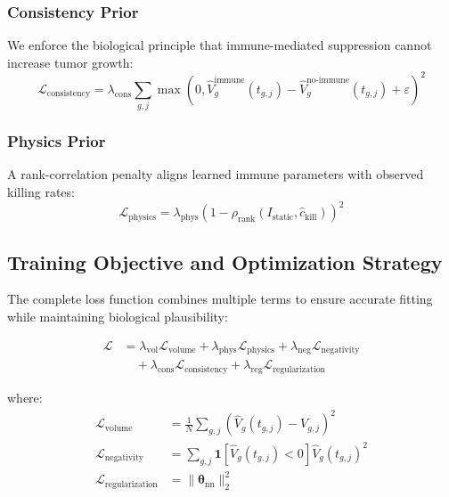 \documentclass{juliacon}
\begin{document}
\subsubsection{Consistency Prior}
We enforce the biological principle that immune-mediated suppression cannot increase tumor growth:
\begin{equation}
\mathcal{L}_{\text{consistency}} = \lambda_{\text{cons}} \sum_{g,j} \max\left(0, \hat{V}^{\text{immune}}_g(t_{g,j}) - \hat{V}^{\text{no-immune}}_g(t_{g,j}) + \varepsilon\right)^2
\label{eq:consistency_prior}
\end{equation}

\subsubsection{Physics Prior}
A rank-correlation penalty aligns learned immune parameters with observed killing rates:
\begin{equation}
\mathcal{L}_{\text{physics}} = \lambda_{\text{phys}}\left(1 - \rho_{\text{rank}}(I_{\text{static}}, \hat{c}_{\text{kill}})\right)^2
\label{eq:physics_prior}
\end{equation}

\subsection{Training Objective and Optimization Strategy}

The complete loss function combines multiple terms to ensure accurate fitting while maintaining biological plausibility:

\begin{align}
\mathcal{L} &= \lambda_{\text{vol}} \mathcal{L}_{\text{volume}} + \lambda_{\text{phys}} \mathcal{L}_{\text{physics}} + \lambda_{\text{neg}} \mathcal{L}_{\text{negativity}} \nonumber \\
&\quad + \lambda_{\text{cons}} \mathcal{L}_{\text{consistency}} + \lambda_{\text{reg}} \mathcal{L}_{\text{regularization}}
\label{eq:total_loss}
\end{align}

where:
\begin{align}
\mathcal{L}_{\text{volume}} &= \frac{1}{N} \sum_{g,j} \left(\hat{V}_g(t_{g,j}) - V_{g,j}\right)^2 \\
\mathcal{L}_{\text{negativity}} &= \sum_{g,j} \mathbf{1}[\hat{V}_g(t_{g,j}) < 0] \hat{V}_g(t_{g,j})^2 \\
\mathcal{L}_{\text{regularization}} &= \|\boldsymbol{\theta}_{\text{nn}}\|_2^2
\end{align}
\end{document}
